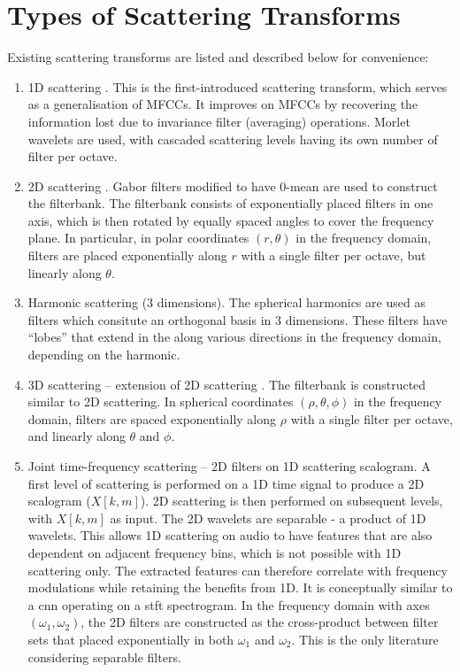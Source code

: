 \section{Types of Scattering Transforms}
Existing scattering transforms are listed and described below for convenience:
\begin{enumerate}
    \item 1D scattering \citep{1dscattering1, ws}. This is the first-introduced scattering transform, which serves as a generalisation of MFCCs. It improves on MFCCs by recovering the information lost due to invariance filter (averaging) operations. Morlet wavelets are used, with cascaded scattering levels having its own number of filter per octave.
    \item 2D scattering \citep{2dscattering}. Gabor filters modified to have 0-mean are used to construct the filterbank. The filterbank consists of exponentially placed filters in one axis, which is then rotated by equally spaced angles to cover the frequency plane. In particular, in polar coordinates $(r, \theta)$ in the frequency domain, filters are placed exponentially along $r$ with a single filter per octave, but linearly along $\theta$.
    \item Harmonic scattering \citep{harmonicscattering} (3 dimensions). The spherical harmonics are used as filters which consitute an orthogonal basis in 3 dimensions. These filters have ``lobes'' that extend in the along various directions in the frequency domain, depending on the harmonic.
    \item 3D scattering -- extension of 2D scattering \citep{3dscattering}. The filterbank is constructed similar to 2D scattering. In spherical coordinates $(\rho, \theta, \phi)$ in the frequency domain, filters are spaced exponentially along $\rho$ with a single filter per octave, and linearly along $\theta$ and $\phi$.
    \item Joint time-frequency \citep{ws_joint_tf,jointtfscattering2} scattering -- 2D filters on 1D scattering scalogram. A first level of scattering is performed on a 1D time signal to produce a 2D scalogram ($X[k, m]$). 2D scattering is then performed on subsequent levels, with $X[k, m]$ as input. The 2D wavelets are separable - a product of 1D wavelets. This allows 1D scattering on audio to have features that are also dependent on adjacent frequency bins, which is not possible with 1D scattering only. The extracted features can therefore correlate with frequency modulations while retaining the benefits from 1D. It is conceptually similar to a \ac{cnn} operating on a \ac{stft} spectrogram. In the frequency domain with axes $(\omega_1, \omega_2)$, the 2D filters are constructed as the cross-product between filter sets that placed exponentially in both $\omega_1$ and $\omega_2$.
    This is the only literature considering separable filters.
\end{enumerate}

